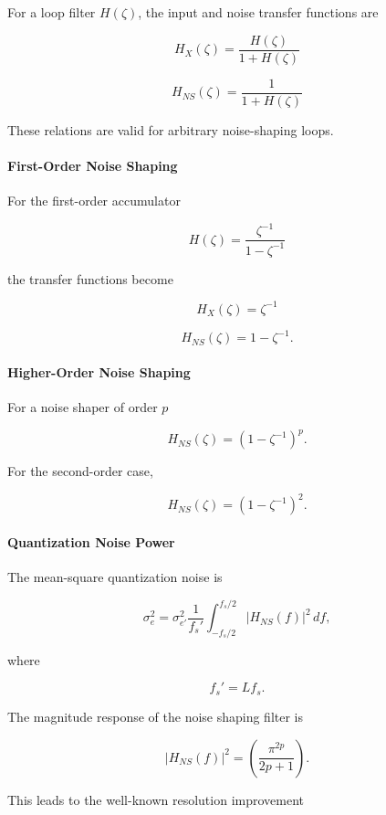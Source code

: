 For a loop filter $H(\zeta)$, the input and noise transfer functions are

\[
\boxed{
H_X(\zeta)=\frac{H(\zeta)}{1+H(\zeta)}
}
\]

\[
\boxed{
H_{NS}(\zeta)=\frac{1}{1+H(\zeta)}
}
\]

These relations are valid for arbitrary noise-shaping loops.

\paragraph{First-Order Noise Shaping}

For the first-order accumulator

\[
H(\zeta)=\frac{\zeta^{-1}}{1-\zeta^{-1}}
\]

the transfer functions become

\[
\boxed{
H_X(\zeta)=\zeta^{-1}
}
\]

\[
\boxed{
H_{NS}(\zeta)=1-\zeta^{-1}.
}
\]

\paragraph{Higher-Order Noise Shaping}

For a noise shaper of order $p$

\[
\boxed{
H_{NS}(\zeta)=\left(1-\zeta^{-1}\right)^p.
}
\]

For the second-order case,

\[
H_{NS}(\zeta)=\left(1-\zeta^{-1}\right)^2.
\]

\paragraph{Quantization Noise Power}

The mean-square quantization noise is

\[
\sigma_e^2
=
\sigma_{e'}^2
\frac{1}{f_s'}
\int_{-f_s/2}^{f_s/2}
|H_{NS}(f)|^2\,df,
\]

where

\[
f_s'=Lf_s.
\]

The magnitude response of the noise shaping filter is

\[
|H_{NS}(f)|^2
=
\left(
\frac{\pi^{2p}}{2p+1}
\right).
\]

This leads to the well-known resolution improvement


